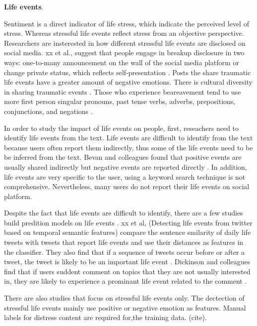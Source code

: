 \textbf{Life events}. 

Sentiment is a direct indicator of life stress, which indicate the perceived level of stress. Whereas stressful life events reflect stress from an objective perspective. Researchers are insterested in how different stressful life events are disclosed on social media. xx et al., suggest that people engage in breakup disclosure in two ways: one-to-many announcement on the wall of the social media platform or change private status, which reflects self-presentation \cite{haimson2018relationship}. Posts the share traumatic life events have a greater amount of negative emotions. There is cultural diversity in sharing traumatic events \cite{freitag2011talking}. Those who experience beareavement tend to use more first person singular pronouns, past tense verbs, adverbs, prepositions, conjunctions, and negations \cite{brubaker2012grief}.
 
 In order to study the impact of life events on people, first, reseachers need to identify life events from the text. Life events are difficult to identify from the text because users often report them indirectly, thus some of the life events need to be be inferred from the text. Bevan and colleagues found that positive events are usually shared indirectly but negative events are reported directly \cite{bevan2015important}. In addition, life events are very specific to the user, using a keyword search technique is not comprehensive. Nevertheless, many users do not report their life events on social platform. 

Despite the fact that life events are difficult to identify, there are a few studies build predition models on life events \cite{khodabakhsh2018detecting,abe2018predicting}. xx et al, (Detecting life events from twitter based on temporal semantic features) compare the sentence smilarity of daily life tweets with tweets that report life events and use their distances as features in the classifier. They also find that if a sequence of tweets occur before or after a tweet, the tweet is likely to be an important life event \cite{khodabakhsh2018detecting}. Dickinson and colleagues find that if users suddent comment on topics that they are not usually interested in, they are likely to experience a prominant life event related to the comment \cite{dickinson2015identifying}.

There are also studies that focus on stressful life events only. The dectection of stressful life events mainly use positive or negative emotion as features. Manual labels for distress content are required for,the training data. (cite). 


